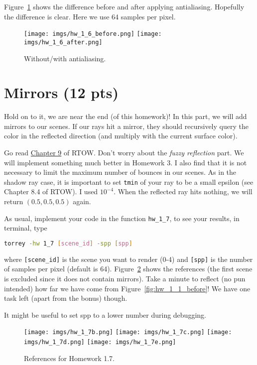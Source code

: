 Figure~\ref{fig:hw_1_6} shows the difference before and after applying antialiasing. Hopefully the difference is clear. Here we use 64 samples per pixel.

\begin{figure}[ht]
    \centering
    \texttt{[image: imgs/hw\_1\_6\_before.png]}
    \texttt{[image: imgs/hw\_1\_6\_after.png]}
    \caption{Without/with antialiasing.}
    \label{fig:hw_1_6}
\end{figure}

\section{Mirrors (12 pts)}
Hold on to it, we are near the end (of this homework)! In this part, we will add mirrors to our scenes. If our rays hit a mirror, they should recursively query the color in the reflected direction (and multiply with the current surface color).

Go read \href{https://raytracing.github.io/books/RayTracingInOneWeekend.html#metal}{Chapter 9} of RTOW. Don't worry about the \emph{fuzzy reflection} part. We will implement something much better in Homework 3. I also find that it is not necessary to limit the maximum number of bounces in our scenes. As in the shadow ray case, it is important to set \lstinline{tmin} of your ray to be a small epsilon (see Chapter 8.4 of RTOW). I used $10^{-4}$. When the reflected ray hits nothing, we will return $(0.5, 0.5, 0.5)$ again.

As usual, implement your code in the function \lstinline{hw_1_7}, to see your results, in terminal, type
\begin{lstlisting}[language=bash]
  torrey -hw 1_7 [scene_id] -spp [spp]
\end{lstlisting}
where \lstinline{[scene_id]} is the scene you want to render (0-4) and \lstinline{[spp]} is the number of samples per pixel (default is 64). Figure~\ref{fig:hw_1_7} shows the references (the first scene is excluded since it does not contain mirrors). Take a minute to reflect (no pun intended) how far we have come from Figure~\ref{fig:hw_1_1_before}! We have one task left (apart from the bonus) though.

It might be useful to set spp to a lower number during debugging.

\begin{figure}[ht]
    \centering
    \texttt{[image: imgs/hw\_1\_7b.png]}
    \texttt{[image: imgs/hw\_1\_7c.png]}
    \texttt{[image: imgs/hw\_1\_7d.png]}
    \texttt{[image: imgs/hw\_1\_7e.png]}
    \caption{References for Homework 1.7.}
    \label{fig:hw_1_7}
\end{figure}

